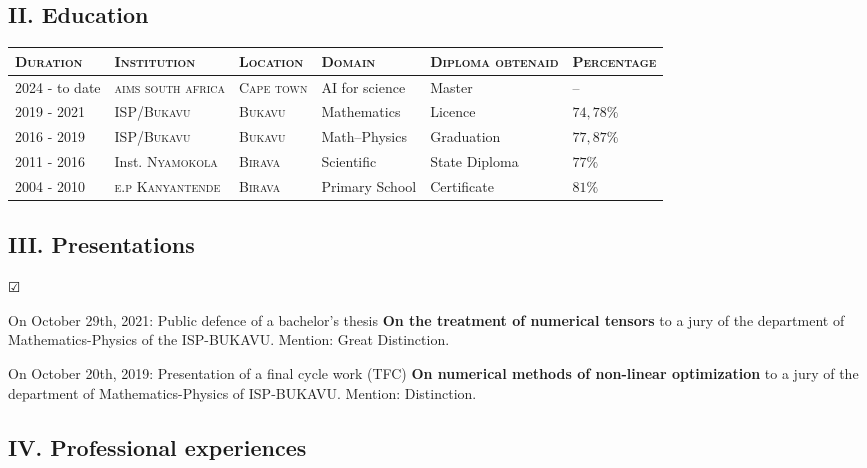 \documentclass[10pt,a4paper,oneside]{article}
\begin{document}
 \subsection*{II. Education}
\begin{center}
	\begin{tabular}{|l|p{3.2cm}|l|l|p{2.8cm}|p{2cm}|}
\hline
\textsc{Duration}&\textsc{Institution}&\textsc{Location}&\textsc{Domain}&\textsc{\small Diploma obtenaid }&{\small\textsc{Percentage}}\\
\hline
2024 - to date&\textsc{aims south africa}&\textsc{Cape town}&AI for science&Master&--\\
\hline
2019 - 2021&ISP/\textsc{Bukavu}&\textsc{Bukavu}&Mathematics&Licence&$ 74,78\% $\\
\hline
2016 - 2019&ISP/\textsc{Bukavu}&\textsc{Bukavu}&Math–Physics&Graduation&$ 77,87\% $\\
\hline
2011 - 2016&Inst. \textsc{Nyamokola}&\textsc{Birava}&Scientific&State Diploma&$ 77\% $\\
\hline
2004 - 2010& \textsc{e.p Kanyantende}&\textsc{Birava}&Primary School&Certificate&$ 81\% $\\
\hline
\end{tabular}
\end{center}
\subsection*{III. Presentations}
\begin{list}{$ \CheckedBox $}{}
\item
 On October 29th, 2021: Public defence of a bachelor's thesis \textbf{On the treatment of numerical tensors} to a jury of the department of Mathematics-Physics of the ISP-BUKAVU. Mention: Great Distinction.

 \item
 On October 20th, 2019: Presentation of a final cycle work (TFC) \textbf{On numerical methods of non-linear optimization} to a jury of the department of Mathematics-Physics of ISP-BUKAVU. Mention: Distinction.

\end{list}


\subsection*{IV. Professional experiences} 
\end{document}

